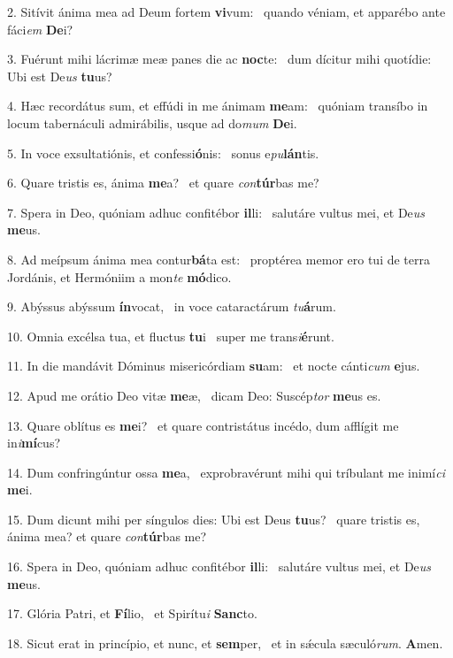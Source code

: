 2. Sitívit ánima mea ad Deum fortem \textbf{vi}vum: \ast\  quando véniam, et apparébo ante fáci\textit{em} \textbf{De}i?\

3. Fuérunt mihi lácrimæ meæ panes die ac \textbf{noc}te: \ast\  dum dícitur mihi quotídie: Ubi est De\textit{us} \textbf{tu}us?\

4. Hæc recordátus sum, et effúdi in me ánimam \textbf{me}am: \ast\  quóniam transíbo in locum tabernáculi admirábilis, usque ad do\textit{mum} \textbf{De}i.\

5. In voce exsultatiónis, et confessi\textbf{ó}nis: \ast\  sonus e\textit{pu}\textbf{lán}tis.\

6. Quare tristis es, ánima \textbf{me}a? \ast\  et quare \textit{con}\textbf{túr}bas me?\

7. Spera in Deo, quóniam adhuc confitébor \textbf{il}li: \ast\  salutáre vultus mei, et De\textit{us} \textbf{me}us.\

8. Ad meípsum ánima mea contur\textbf{bá}ta est: \ast\  proptérea memor ero tui de terra Jordánis, et Hermóniim a mon\textit{te} \textbf{mó}dico.\

9. Abýssus abýssum \textbf{ín}vocat, \ast\  in voce cataractárum \textit{tu}\textbf{á}rum.\

10. Omnia excélsa tua, et fluctus \textbf{tu}i \ast\  super me trans\textit{i}\textbf{é}runt.\

11. In die mandávit Dóminus misericórdiam \textbf{su}am: \ast\  et nocte cánti\textit{cum} \textbf{e}jus.\

12. Apud me orátio Deo vitæ \textbf{me}æ, \ast\  dicam Deo: Suscép\textit{tor} \textbf{me}us es.\

13. Quare oblítus es \textbf{me}i? \ast\  et quare contristátus incédo, dum afflígit me in\textit{i}\textbf{mí}cus?\

14. Dum confringúntur ossa \textbf{me}a, \ast\  exprobravérunt mihi qui tríbulant me inimí\textit{ci} \textbf{me}i.\

15. Dum dicunt mihi per síngulos dies: Ubi est Deus \textbf{tu}us? \ast\  quare tristis es, ánima mea? et quare \textit{con}\textbf{túr}bas me?\

16. Spera in Deo, quóniam adhuc confitébor \textbf{il}li: \ast\  salutáre vultus mei, et De\textit{us} \textbf{me}us.\

17. Glória Patri, et \textbf{Fí}lio, \ast\  et Spirítu\textit{i} \textbf{Sanc}to.\

18. Sicut erat in princípio, et nunc, et \textbf{sem}per, \ast\  et in sǽcula sæculó\textit{rum}. \textbf{A}men.\

